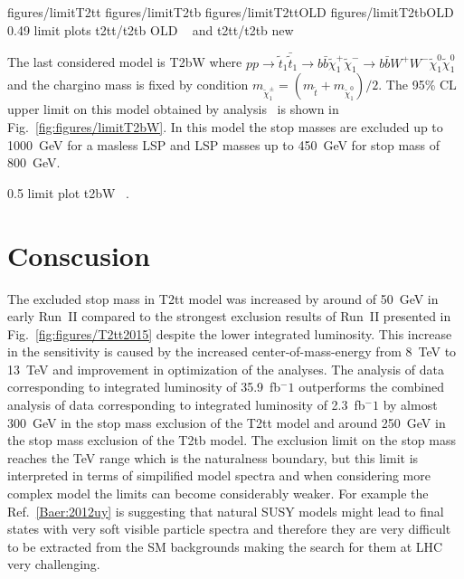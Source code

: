                 {figures/limitT2tt} %
                 {figures/limitT2tb} %
                 {figures/limitT2ttOLD} %
                 {figures/limitT2tbOLD} %
                 {0.49}       %
                 { limit plots t2tt/t2tb OLD ~\cite{Sirunyan:2016jpr} and t2tt/t2tb new  ~\cite{Sirunyan:2017xse}}

The last considered model is T2bW where $ pp \to \tilde{t}_{1} \bar{\tilde{t}}_{1} \to b \bar{b} \tilde{\chi}^{+}_{1} \tilde{\chi}^{-}_{1} \to b \bar{b} W^{+} W^{-} \tilde{\chi}^{0}_{1} \tilde{\chi}^{0}_{1}$ and the chargino mass is fixed by condition $m_{\tilde{\chi}_{1}^{\pm}} = ( m_{\tilde{t}} +  m_{\tilde{\chi}_{1}^{0}} )/2$. The 95\% CL upper limit on this model obtained by analysis~\cite{Sirunyan:2017xse} is shown  in Fig.~\ref{fig:figures/limitT2bW}. In this model the stop masses are excluded up to 1000~GeV for a masless LSP and LSP masses up to 450~GeV for stop mass of 800~GeV.

                 {0.5}       %
                 { limit plot t2bW ~\cite{Sirunyan:2017xse}. }

\section{Conscusion}

The excluded stop mass in T2tt model was increased by around of 50~GeV in early Run~II compared to the strongest exclusion results of Run~II presented in Fig.~\ref{fig:figures/T2tt2015} despite the lower integrated luminosity. This increase in the sensitivity is caused by the increased center-of-mass-energy from 8~TeV to 13~TeV and improvement in optimization of the analyses. The analysis of data corresponding to integrated luminosity of 35.9~fb$^-1$ outperforms the  combined analysis of data corresponding to integrated luminosity of 2.3~fb$^-1$ by almost 300~GeV in the stop mass exclusion of the T2tt model and around 250~GeV in the stop mass exclusion of the T2tb model. The exclusion limit on the stop mass reaches the TeV range which is the naturalness boundary, but this limit is interpreted in terms of simpilified model spectra and when considering more complex model the limits can become considerably weaker. For example the Ref.~\ref{Baer:2012uy} is suggesting that natural SUSY models might lead to final states with very soft visible particle spectra and therefore they are very difficult to be extracted from the SM backgrounds making the search for them at LHC very challenging.


